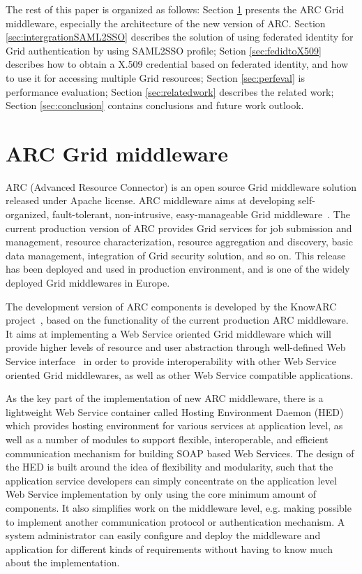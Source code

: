 \documentclass[conference]{IEEEtran}
\begin{document}
The rest of this paper is organized as follows: Section \ref{sec:arcmiddleware} presents the 
ARC Grid middleware, especially the architecture of the new version of ARC. Section 
\ref{sec:intergrationSAML2SSO} describes the solution of using federated identity for 
Grid authentication by using SAML2SSO profile; Setion \ref{sec:fedidtoX509} describes
how to obtain a X.509 credential based on federated identity, and how to use it for 
accessing multiple Grid resources; Section \ref{sec:perfeval} is performance evaluation;
Section \ref{sec:relatedwork} describes the related work; Section \ref{sec:conclusion} 
contains conclusions and future work outlook.

\section{ARC Grid middleware}
\label{sec:arcmiddleware}

ARC (Advanced Resource Connector) is an open source Grid middleware solution released 
under Apache license. ARC middleware aims at developing self-organized, 
fault-tolerant, non-intrusive, easy-manageable Grid middleware~\cite{MEllert07}. 
The current production version of ARC provides Grid services for job submission and 
management, resource characterization, resource aggregation and discovery, basic data 
management, integration of Grid security solution, and so on. This release has been 
deployed and used in production environment, and is one of the widely deployed Grid 
middlewares in Europe.

The development version of ARC components is developed by the KnowARC project~\cite{KnowARClink}, 
based on the functionality of the current production ARC middleware. It aims at 
implementing a Web Service oriented Grid middleware which will provide higher levels of 
resource and user abstraction through well-defined Web Service interface~\cite{KnowARCDesignlink} 
in order to provide interoperability with other Web Service oriented Grid middlewares, as well as 
other Web Service compatible applications.

As the key part of the implementation of new ARC middleware, there is a lightweight Web 
Service container called Hosting Environment Daemon (HED) which provides hosting environment 
for various services at application level, as well as a number of modules to support flexible, 
interoperable, and efficient communication mechanism for building SOAP based Web Services. 
The design of the HED is built around the idea of flexibility and modularity,
such that the application service developers can simply concentrate on the application 
level Web Service implementation by only using the core minimum amount of components. It 
also simplifies work on the middleware level, e.g. making possible to implement another 
communication protocol or authentication mechanism. A system administrator can easily 
configure and deploy the middleware and application for different kinds of requirements 
without having to know much about the implementation. 
\end{document}
